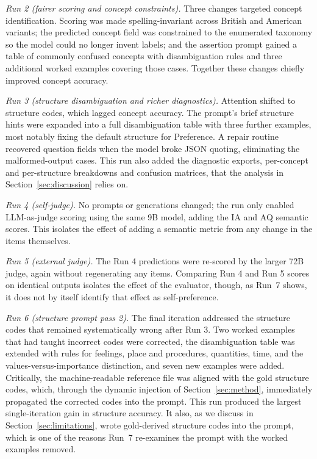 \documentclass[onecolumn, 11pt]{IEEEtran}
\begin{document}
\emph{Run 2 (fairer scoring and concept constraints).} Three changes targeted concept identification. Scoring was made spelling-invariant across British and American variants; the predicted concept field was constrained to the enumerated taxonomy so the model could no longer invent labels; and the assertion prompt gained a table of commonly confused concepts with disambiguation rules and three additional worked examples covering those cases. Together these changes chiefly improved concept accuracy.

\emph{Run 3 (structure disambiguation and richer diagnostics).} Attention shifted to structure codes, which lagged concept accuracy. The prompt's brief structure hints were expanded into a full disambiguation table with three further examples, most notably fixing the default structure for Preference. A repair routine recovered question fields when the model broke JSON quoting, eliminating the malformed-output cases. This run also added the diagnostic exports, per-concept and per-structure breakdowns and confusion matrices, that the analysis in Section~\ref{sec:discussion} relies on.

\emph{Run 4 (self-judge).} No prompts or generations changed; the run only enabled LLM-as-judge scoring using the same 9B model, adding the IA and AQ semantic scores. This isolates the effect of adding a semantic metric from any change in the items themselves.

\emph{Run 5 (external judge).} The Run 4 predictions were re-scored by the larger 72B judge, again without regenerating any items. Comparing Run 4 and Run 5 scores on identical outputs isolates the effect of the evaluator, though, as Run~7 shows, it does not by itself identify that effect as self-preference.

\emph{Run 6 (structure prompt pass 2).} The final iteration addressed the structure codes that remained systematically wrong after Run 3. Two worked examples that had taught incorrect codes were corrected, the disambiguation table was extended with rules for feelings, place and procedures, quantities, time, and the values-versus-importance distinction, and seven new examples were added. Critically, the machine-readable reference file was aligned with the gold structure codes, which, through the dynamic injection of Section~\ref{sec:method}, immediately propagated the corrected codes into the prompt. This run produced the largest single-iteration gain in structure accuracy. It also, as we discuss in Section~\ref{sec:limitations}, wrote gold-derived structure codes into the prompt, which is one of the reasons Run~7 re-examines the prompt with the worked examples removed.
\end{document}
